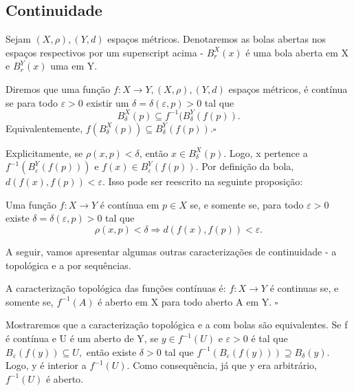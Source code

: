 \documentclass[metric_notes.tex]{subfiles}
\begin{document}
\subsection{Continuidade}
Sejam \((X, \rho ), (Y, d)\) espaços métricos. Denotaremos as bolas abertas nos espaços respectivos por um superscript acima - \(B^{X}_{r}(x)\) é uma bola aberta
em X e \(B_{r}^{Y}(x)\) uma em Y.
\begin{def*}
	Diremos que uma função \(f:X\rightarrow Y, (X, \rho ), (Y, d)\) espaços métricos, é contínua se para todo \(\varepsilon >0\) existir um \(\delta = \delta (\varepsilon, p) > 0\) tal que
	\[
		B_{\delta }^{X}(p)\subseteq{f^{-1}(B_{\delta }^{Y}(f(p))}.
	\]
	Equivalentemente, \(f(B_{\delta }^{X}(p))\subseteq{B_{\delta }^{Y}(f(p))}.\square\)
\end{def*}
Explicitamente, se \(\rho (x, p) < \delta \), então \(x\in B_{\delta }^{X}(p).\) Logo, x pertence a \(f^{-1}(B_{\varepsilon }^{Y}(f(p)))\) e
\(f(x)\in B_{\varepsilon }^{Y}(f(p)).\) Por definição da bola, \(d(f(x), f(p)) < \varepsilon.\) Isso pode ser reescrito na seguinte proposição:
\begin{prop*}
	Uma função \(f:X\rightarrow Y\) é contínua em \(p\in X\) se, e somente se, para todo \(\varepsilon >0\) existe
	\(\delta = \delta (\varepsilon , p) > 0\) tal que
	\[
		\rho (x, p)<\delta  \Rightarrow d(f(x), f(p)) <\varepsilon .
	\]
\end{prop*}

A seguir, vamos apresentar algumas outras caracterizações de continuidade - a topológica e a por sequências.
\begin{def*}
	A caracterização topológica das funções contínuas é: \(f:X\rightarrow Y\) é continuas se, e somente se, \(f^{-1}(A)\) é aberto em X para todo aberto A em Y. \(\square\)
\end{def*}
Mostraremos que a caracterização topológica e a com bolas são equivalentes. Se f é contínua e U é um aberto de Y, se
\(y\in f^{-1}(U)\) e \(\varepsilon > 0\) é tal que \(B_{\varepsilon }(f(y)) \subseteq{U},\) então existe \(\delta  > 0\)
tal que \(f^{-1}(B_{\varepsilon }(f(y)))\supseteq{B_{\delta }(y)}.\) Logo, y é interior a \(f^{-1}(U).\) Como
consequência, já que y era arbitrário, \(f^{-1}(U)\) é aberto.
\end{document}
